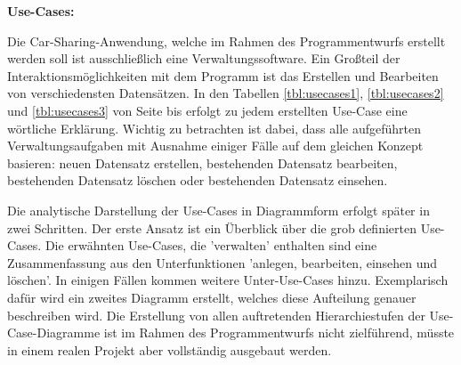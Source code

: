 \textbf{Use-Cases:}


Die Car-Sharing-Anwendung, welche im Rahmen des Programmentwurfs erstellt werden soll ist ausschließlich eine Verwaltungssoftware. Ein Großteil der Interaktionsmöglichkeiten mit dem Programm ist das Erstellen und Bearbeiten von verschiedensten Datensätzen. 
In den Tabellen \ref{tbl:usecases1}, \ref{tbl:usecases2} und \ref{tbl:usecases3} von Seite \pageref{tbl:usecases1} bis \pageref{tbl:usecases3} erfolgt zu jedem erstellten Use-Case eine wörtliche Erklärung. Wichtig zu betrachten ist dabei, dass alle aufgeführten Verwaltungsaufgaben mit Ausnahme einiger Fälle auf dem gleichen Konzept basieren: neuen Datensatz erstellen, bestehenden Datensatz bearbeiten, bestehenden Datensatz löschen oder bestehenden Datensatz einsehen.

Die analytische Darstellung der Use-Cases in Diagrammform erfolgt später in zwei Schritten. Der erste Ansatz ist ein  Überblick über die grob definierten Use-Cases. Die erwähnten Use-Cases, die 'verwalten' enthalten sind eine Zusammenfassung aus den Unterfunktionen 'anlegen, bearbeiten, einsehen und löschen'. In einigen Fällen kommen weitere Unter-Use-Cases hinzu. Exemplarisch dafür wird ein zweites Diagramm erstellt, welches diese Aufteilung genauer beschreiben wird. Die Erstellung von allen auftretenden Hierarchiestufen der Use-Case-Diagramme ist im Rahmen des Programmentwurfs nicht zielführend, müsste in einem realen Projekt aber vollständig ausgebaut werden. 

\newpage

